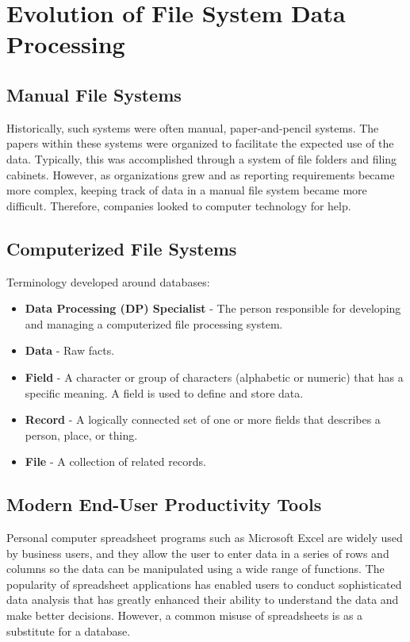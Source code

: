 \documentclass[a4paper, 12pt, titlepage]{report}
\begin{document}
\section{Evolution of File System Data Processing}
\subsection{Manual File Systems}
Historically, such systems were often manual, paper-and-pencil systems. The papers within these systems were organized to facilitate the expected use of the data. Typically, this was accomplished through a system of file folders and filing cabinets.
However, as organizations grew and as reporting requirements became more complex, keeping track of data in a manual file system became more difficult. Therefore, companies looked to computer technology for help.

\subsection{Computerized File Systems}
Terminology developed around databases:
\begin{itemize}
\item \textbf{Data Processing (DP) Specialist} - The person responsible for developing and managing a computerized file processing system.
\item \textbf{Data} - Raw facts.
\item \textbf{Field} - A character or group of characters (alphabetic or numeric) that has a specific meaning. A field is used to define and store data.
\item \textbf{Record} - A logically connected set of one or more fields that describes a person, place, or thing.
\item \textbf{File} - A collection of related records.
\end{itemize}

\subsection{Modern End-User Productivity Tools}
Personal computer spreadsheet programs such as Microsoft Excel are widely used by business users, and they allow the user to enter data in a series of rows and columns so the data can be manipulated using a wide range of functions. The popularity of spreadsheet applications has enabled users to conduct sophisticated data analysis that has greatly enhanced their ability to understand the data and make better decisions. However, a common misuse of spreadsheets is as a substitute for a database.
\end{document}
